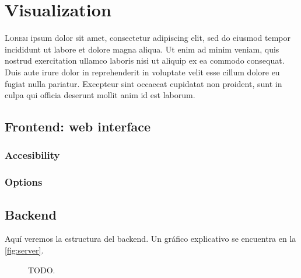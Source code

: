 

\chapter{Visualization} \label{cha:web}



\lettrine{L}{orem} ipsum dolor sit amet, consectetur
adipiscing elit, sed do eiusmod tempor incididunt ut labore et dolore magna
aliqua. Ut enim ad minim veniam, quis nostrud exercitation ullamco laboris nisi
ut aliquip ex ea commodo consequat. Duis aute irure dolor in reprehenderit in
voluptate velit esse cillum dolore eu fugiat nulla pariatur. Excepteur sint
occaecat cupidatat non proident, sunt in culpa qui officia deserunt mollit anim
id est laborum.


\section{Frontend: web interface}


\subsection{Accesibility}


\subsection{Options}


\section{Backend}

Aquí veremos la estructura del backend. Un gráfico explicativo se encuentra en
la \vref{fig:server}.

\begin{figure}[ht]
  \centering
  
  \caption[TODO]{TODO.}
  \label{fig:server}
\end{figure}
